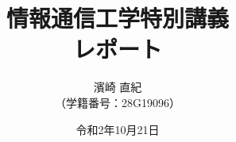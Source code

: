 \documentclass[a4paper]{jsarticle}
\title{\Huge 情報通信工学特別講義\\\huge レポート\vspace{120mm}}
\author{\Large 濱崎 直紀\\\large （学籍番号：28G19096）\vspace{25mm}}
\date{令和2年10月21日}
\begin{document}
\begin{titlepage}
\maketitle
\thispagestyle{empty}
\end{titlepage}

\pagestyle{empty}



\end{document}
